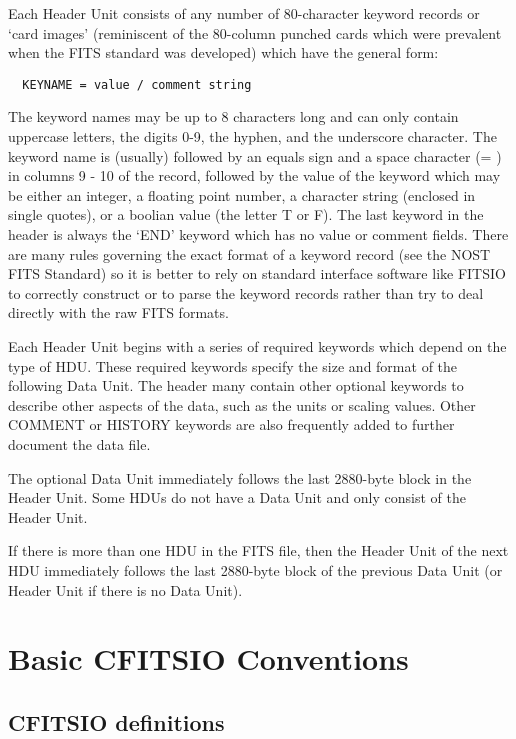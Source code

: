Each Header Unit consists of any number of 80-character keyword records
or `card images' (reminiscent of the 80-column punched cards which
were prevalent when the FITS standard was developed) which have the
general form:

\begin{verbatim}
  KEYNAME = value / comment string
\end{verbatim}
The keyword names may be up to 8 characters long and can only contain
uppercase letters, the digits 0-9, the hyphen, and the underscore
character. The keyword name is (usually) followed by an equals sign and
a space character (= ) in columns 9 - 10 of the record, followed by the
value of the keyword which may be either an integer, a floating point
number, a character string (enclosed in single quotes), or a boolian
value (the letter T or F). The last keyword in the header is always the
`END' keyword which has no value or comment fields. There are many
rules governing the exact format of a keyword record (see the NOST FITS
Standard) so it is better to rely on standard interface software like
FITSIO to correctly construct or to parse the keyword records rather
than try to deal directly with the raw FITS formats.

Each Header Unit begins with a series of required keywords which depend
on the type of HDU.  These required keywords specify the size and
format of the following Data Unit.  The header many contain other
optional keywords to describe other aspects of the data, such as the
units or scaling values.  Other COMMENT or HISTORY keywords are also
frequently added to further document the data file.

The optional Data Unit immediately follows the last 2880-byte block in
the Header Unit.  Some HDUs do not have a Data Unit and only consist of
the Header Unit.

If there is more than one HDU in the FITS file, then the Header Unit of
the next HDU immediately follows the last 2880-byte block of the
previous Data Unit (or Header Unit if there is no Data Unit).


\chapter{  Basic CFITSIO Conventions }



\section{CFITSIO definitions}

